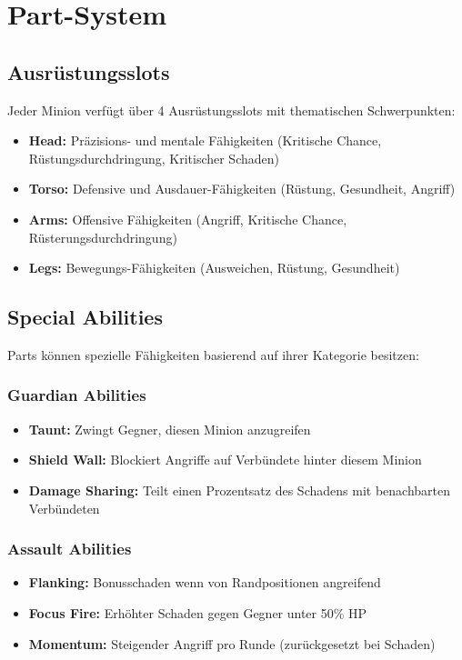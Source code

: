 \section{Part-System}

\subsection{Ausrüstungsslots}
Jeder Minion verfügt über 4 Ausrüstungsslots mit thematischen Schwerpunkten:
\begin{itemize}
    \item \textbf{Head:} Präzisions- und mentale Fähigkeiten (Kritische Chance, Rüstungsdurchdringung, Kritischer Schaden)
    \item \textbf{Torso:} Defensive und Ausdauer-Fähigkeiten (Rüstung, Gesundheit, Angriff)
    \item \textbf{Arms:} Offensive Fähigkeiten (Angriff, Kritische Chance, Rüsterungsdurchdringung)
    \item \textbf{Legs:} Bewegungs-Fähigkeiten (Ausweichen, Rüstung, Gesundheit)
\end{itemize}

\subsection{Special Abilities}
Parts können spezielle Fähigkeiten basierend auf ihrer Kategorie besitzen:

\subsubsection{Guardian Abilities}
\begin{itemize}
    \item \textbf{Taunt:} Zwingt Gegner, diesen Minion anzugreifen
    \item \textbf{Shield Wall:} Blockiert Angriffe auf Verbündete hinter diesem Minion
    \item \textbf{Damage Sharing:} Teilt einen Prozentsatz des Schadens mit benachbarten Verbündeten
\end{itemize}

\subsubsection{Assault Abilities}
\begin{itemize}
    \item \textbf{Flanking:} Bonusschaden wenn von Randpositionen angreifend
    \item \textbf{Focus Fire:} Erhöhter Schaden gegen Gegner unter 50\% HP
    \item \textbf{Momentum:} Steigender Angriff pro Runde (zurückgesetzt bei Schaden)
\end{itemize}

